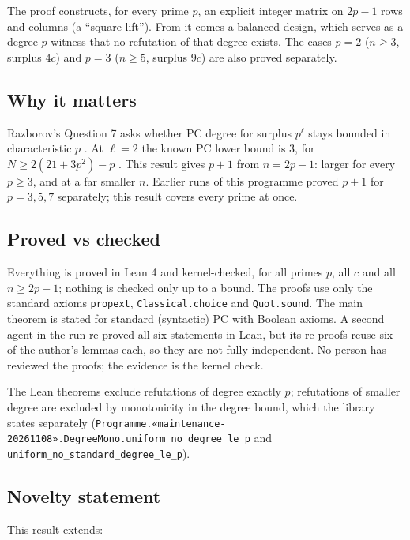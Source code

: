 \documentclass{article}
\begin{document}
The proof constructs, for every prime $p$, an explicit integer matrix on $2p-1$ rows and columns
(a ``square lift''). From it comes a balanced design, which serves as a degree-$p$ witness that no
refutation of that degree exists. The cases $p=2$ ($n\ge3$, surplus $4c$) and $p=3$ ($n\ge5$,
surplus $9c$) are also proved separately.

\subsection*{Why it matters}

Razborov's Question 7 asks whether PC degree for surplus $p^\ell$ stays bounded in characteristic
$p$ \cite{razborov2001php}. At $\ell=2$ the known PC lower bound is $3$, for
$N\ge2(21+3p^2)-p$ \cite{riis1997nonconstant}. This result gives $p+1$ from $n=2p-1$: larger for every
$p\ge3$, and at a far smaller $n$. Earlier runs of this programme proved $p+1$ for $p=3,5,7$
separately; this result covers every prime at once.

\subsection*{Proved vs checked}

Everything is proved in Lean 4 and kernel-checked, for all primes $p$, all $c$ and all
$n\ge2p-1$; nothing is checked only up to a bound. The proofs use only the standard axioms
\texttt{propext}, \texttt{Classical.choice} and \texttt{Quot.sound}. The main theorem is stated for standard
(syntactic) PC with Boolean axioms. A second agent in the run re-proved all six statements in Lean, but its
re-proofs reuse six of the author's lemmas each, so they are not fully independent. No person has
reviewed the proofs; the evidence is the kernel check.

The Lean theorems exclude refutations of degree exactly $p$; refutations of smaller degree are excluded by
monotonicity in the degree bound, which the library states separately
(\texttt{Programme.«maintenance-20261108».DegreeMono.uniform\_no\_degree\_le\_p} and \texttt{uniform\_no\_standard\_degree\_le\_p}).

\subsection*{Novelty statement}

This result extends:
\end{document}
